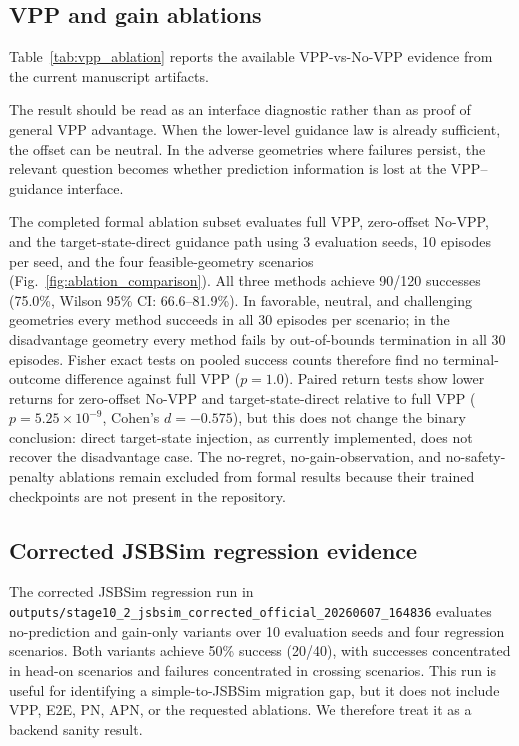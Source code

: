 \subsection{VPP and gain ablations}\label{sec:ablation}

Table~\ref{tab:vpp_ablation} reports the available VPP-vs-No-VPP evidence from the current manuscript artifacts.



The result should be read as an interface diagnostic rather than as proof of general VPP advantage. When the lower-level guidance law is already sufficient, the offset can be neutral. In the adverse geometries where failures persist, the relevant question becomes whether prediction information is lost at the VPP--guidance interface.



The completed formal ablation subset evaluates full VPP, zero-offset No-VPP, and the target-state-direct guidance path using 3 evaluation seeds, 10 episodes per seed, and the four feasible-geometry scenarios (Fig.~\ref{fig:ablation_comparison}). All three methods achieve 90/120 successes (75.0\%, Wilson 95\% CI: 66.6--81.9\%). In favorable, neutral, and challenging geometries every method succeeds in all 30 episodes per scenario; in the disadvantage geometry every method fails by out-of-bounds termination in all 30 episodes. Fisher exact tests on pooled success counts therefore find no terminal-outcome difference against full VPP ($p=1.0$). Paired return tests show lower returns for zero-offset No-VPP and target-state-direct relative to full VPP ($p=5.25\times10^{-9}$, Cohen's $d=-0.575$), but this does not change the binary conclusion: direct target-state injection, as currently implemented, does not recover the disadvantage case. The no-regret, no-gain-observation, and no-safety-penalty ablations remain excluded from formal results because their trained checkpoints are not present in the repository.



\subsection{Corrected JSBSim regression evidence}\label{sec:jsbsim_validation}

The corrected JSBSim regression run in \texttt{outputs/stage10\_2\_jsbsim\_corrected\_official\_20260607\_164836} evaluates no-prediction and gain-only variants over 10 evaluation seeds and four regression scenarios. Both variants achieve 50\% success (20/40), with successes concentrated in head-on scenarios and failures concentrated in crossing scenarios. This run is useful for identifying a simple-to-JSBSim migration gap, but it does not include VPP, E2E, PN, APN, or the requested ablations. We therefore treat it as a backend sanity result.


